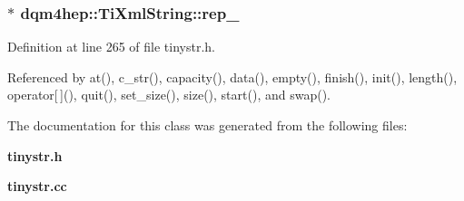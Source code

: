 \subsubsection[{rep\+\_\+}]{$\ast$ dqm4hep\+::\+Ti\+Xml\+String\+::rep\+\_\+\hspace{0.3cm}{\ttfamily [private]}}\label{classdqm4hep_1_1TiXmlString_a4663c922778d1bae36f24115a6137d1a}


Definition at line 265 of file tinystr.\+h.



Referenced by at(), c\+\_\+str(), capacity(), data(), empty(), finish(), init(), length(), operator[$\,$](), quit(), set\+\_\+size(), size(), start(), and swap().



The documentation for this class was generated from the following files\+:\begin{DoxyCompactItemize}
\item 
{\bf tinystr.\+h}\item 
{\bf tinystr.\+cc}\end{DoxyCompactItemize}

